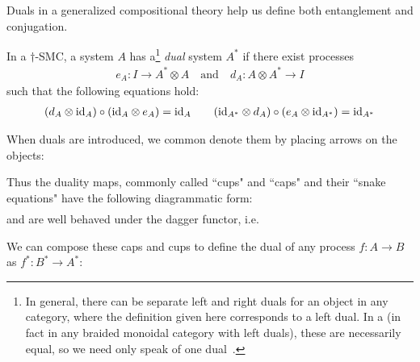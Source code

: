 Duals in a generalized compositional theory help us define both entanglement and conjugation.

\begin{defn}
\label{def:dual}
In a $\dagger$-SMC, a system $A$ has a\footnote{In general, there can be separate left and right duals for an object in any category, where the definition given here corresponds to a left dual. In a \dsmc(in fact in any braided monoidal category with left duals), these are necessarily equal, so we need only speak of one dual~\cite[Prop.~7.2]{joyal1993braided}. } \emph{dual} system $A^*$ if there exist processes 
\begin{align}
e_A:I\to A^*\otimes A \quad \mbox{and}\quad d_A:A\otimes A^*\to I
\end{align}
such that the following equations hold:
\begin{align}
(d_A\otimes \mbox{id}_{A})\circ(\mbox{id}_{A}\otimes e_A) = \mbox{id}_{A} \qquad (\mbox{id}_{A^*}\otimes d_A)\circ(e_A\otimes \mbox{id}_{A^*})=\mbox{id}_{A^*}
\end{align}
\end{defn}

When duals are introduced, we common denote them by placing arrows on the objects:
\begin{equation}

\end{equation}

Thus the duality maps, commonly called ``cups" and ``caps" and their ``snake equations" have the following diagrammatic form:
\begin{align}

\end{align}
\begin{equation}
\label{eq:snake}

\end{equation} 
\noindent and are well behaved under the dagger functor, i.e.
\begin{equation}

\end{equation}

We can compose these caps and cups to define the dual of any process $f:A\to B$ as $f^*:B^*\to A^*$:
\begin{equation}

\end{equation}

